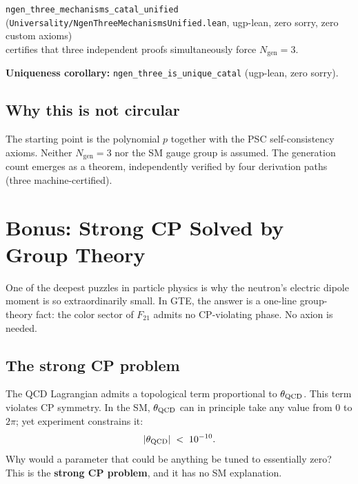 \documentclass[11pt,a4paper]{article}
\newcommand{\term}[1]{\textbf{#1}}
\newcommand{\lean}[1]{\texttt{#1}}
\newcommand{\Ngen}{N_{\mathrm{gen}}}
\begin{document}
\begin{tcolorbox}[colback=boxorange,colframe=orange!60!black,
  title={Unified Three-Mechanism Certificate (machine-certified)}]
\lean{ngen\_three\_mechanisms\_catal\_unified}\\
(\texttt{Universality/NgenThreeMechanismsUnified.lean}, ugp-lean,
zero sorry, zero custom axioms)\\[4pt]
certifies that three independent proofs simultaneously force $\Ngen = 3$.

\textbf{Uniqueness corollary:} \lean{ngen\_three\_is\_unique\_catal}
(ugp-lean, zero sorry).
\end{tcolorbox}

\subsection{Why this is not circular}

The starting point is the polynomial $p$ together with the PSC
self-consistency axioms.  Neither $\Ngen = 3$ nor the SM gauge group is
assumed.  The generation count emerges as a theorem, independently verified
by four derivation paths (three machine-certified).

\section{Bonus: Strong CP Solved by Group Theory}
\label{sec:strongcp}

\begin{tcolorbox}[colback=boxblue,colframe=blue!40!black,title=Key idea]
One of the deepest puzzles in particle physics is why the neutron's electric
dipole moment is so extraordinarily small.  In GTE, the answer is a one-line
group-theory fact: the color sector of $F_{21}$ admits no CP-violating
phase.  No axion is needed.
\end{tcolorbox}

\subsection{The strong CP problem}

The QCD Lagrangian admits a topological term proportional to
$\theta_{\rm QCD}$.  This term violates CP symmetry.  In the SM,
$\theta_{\rm QCD}$ can in principle take any value from $0$ to $2\pi$; yet
experiment constrains it:
\[
  |\theta_{\rm QCD}| \;<\; 10^{-10}.
\]
Why would a parameter that could be anything be tuned to essentially zero?
This is the \term{strong CP problem}, and it has no SM explanation.
\end{document}
